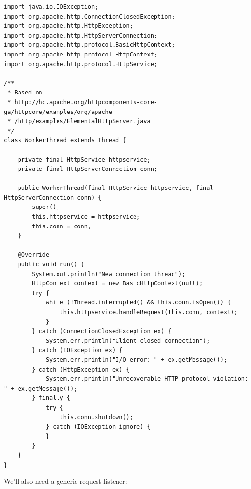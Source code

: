 \begin{lstlisting}
import java.io.IOException;
import org.apache.http.ConnectionClosedException;
import org.apache.http.HttpException;
import org.apache.http.HttpServerConnection;
import org.apache.http.protocol.BasicHttpContext;
import org.apache.http.protocol.HttpContext;
import org.apache.http.protocol.HttpService;

/**
 * Based on
 * http://hc.apache.org/httpcomponents-core-ga/httpcore/examples/org/apache
 * /http/examples/ElementalHttpServer.java
 */
class WorkerThread extends Thread {

	private final HttpService httpservice;
	private final HttpServerConnection conn;

	public WorkerThread(final HttpService httpservice, final HttpServerConnection conn) {
		super();
		this.httpservice = httpservice;
		this.conn = conn;
	}

	@Override
	public void run() {
		System.out.println("New connection thread");
		HttpContext context = new BasicHttpContext(null);
		try {
			while (!Thread.interrupted() && this.conn.isOpen()) {
				this.httpservice.handleRequest(this.conn, context);
			}
		} catch (ConnectionClosedException ex) {
			System.err.println("Client closed connection");
		} catch (IOException ex) {
			System.err.println("I/O error: " + ex.getMessage());
		} catch (HttpException ex) {
			System.err.println("Unrecoverable HTTP protocol violation: " + ex.getMessage());
		} finally {
			try {
				this.conn.shutdown();
			} catch (IOException ignore) {
			}
		}
	}
}
\end{lstlisting}

\newpage
\noindent
We'll also need a generic request listener:

